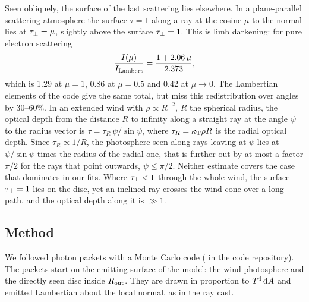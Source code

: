 Seen obliquely, the surface of the last scattering lies elsewhere.
In a plane-parallel scattering atmosphere the surface $\tau = 1$ along a ray at the cosine $\mu$ to the normal lies at $\tau_\perp = \mu$, slightly above the surface $\tau_\perp = 1$.
This is limb darkening: for pure electron scattering \citep{Chandrasekhar1960}
\begin{equation}
\frac{I(\mu)}{I_{\rm Lambert}} = \frac{1 + 2.06\,\mu}{2.373} ,
\label{eq:mc_limb}
\end{equation}
which is 1.29 at $\mu = 1$, 0.86 at $\mu = 0.5$ and 0.42 at $\mu \to 0$.
The Lambertian elements of the code give the same total, but miss this redistribution over angles by 30--60\%.
In an extended wind with $\rho \propto R^{-2}$, $R$ the spherical radius, the optical depth from the distance $R$ to infinity along a straight ray at the angle $\psi$ to the radius vector is $\tau = \tau_R\,\psi/\sin\psi$, where $\tau_R = \kappa_{\rm T}\rho R$ is the radial optical depth.
Since $\tau_R \propto 1/R$, the photosphere seen along rays leaving at $\psi$ lies at $\psi/\sin\psi$ times the radius of the radial one, that is further out by at most a factor $\pi/2$ for the rays that point outwards, $\psi \le \pi/2$.
Neither estimate covers the case that dominates in our fits.
Where $\tau_\perp < 1$ through the whole wind, the surface $\tau_\perp = 1$ lies on the disc, yet an inclined ray crosses the wind cone over a long path, and the optical depth along it is $\gg 1$.

\subsection{Method}
\label{app:mc:method}

We followed photon packets with a Monte Carlo code ( in the code repository).
The packets start on the emitting surface of the model: the wind photosphere and the directly seen disc inside $R_{\rm out}$.
They are drawn in proportion to $T^4\,{\rm d}A$ and emitted Lambertian about the local normal, as in the ray cast.

